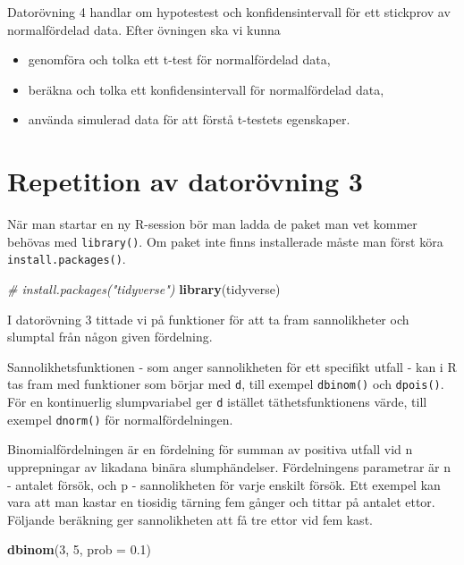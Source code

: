 \documentclass[
]{book}
\newenvironment{Shaded}{\begin{snugshade}}{\end{snugshade}}
\newcommand{\AttributeTok}[1]{\textcolor[rgb]{0.13,0.29,0.53}{#1}}
\newcommand{\CommentTok}[1]{\textcolor[rgb]{0.56,0.35,0.01}{\textit{#1}}}
\newcommand{\DecValTok}[1]{\textcolor[rgb]{0.00,0.00,0.81}{#1}}
\newcommand{\FloatTok}[1]{\textcolor[rgb]{0.00,0.00,0.81}{#1}}
\newcommand{\FunctionTok}[1]{\textcolor[rgb]{0.13,0.29,0.53}{\textbf{#1}}}
\newcommand{\NormalTok}[1]{#1}
\theoremstyle{definition}
\theoremstyle{definition}
\theoremstyle{definition}
\theoremstyle{definition}
\theoremstyle{remark}
\begin{document}
Datorövning 4 handlar om hypotestest och konfidensintervall för ett stickprov av normalfördelad data. Efter övningen ska vi kunna

\begin{itemize}
\item
  genomföra och tolka ett t-test för normalfördelad data,
\item
  beräkna och tolka ett konfidensintervall för normalfördelad data,
\item
  använda simulerad data för att förstå t-testets egenskaper.
\end{itemize}

\hypertarget{repetition-av-datoruxf6vning-3}{%
\section{Repetition av datorövning 3}\label{repetition-av-datoruxf6vning-3}}

När man startar en ny R-session bör man ladda de paket man vet kommer behövas med \texttt{library()}. Om paket inte finns installerade måste man först köra \texttt{install.packages()}.

\begin{Shaded}
\begin{Highlighting}[]
\CommentTok{\# install.packages("tidyverse")}
\FunctionTok{library}\NormalTok{(tidyverse)}
\end{Highlighting}
\end{Shaded}

I datorövning 3 tittade vi på funktioner för att ta fram sannolikheter och slumptal från någon given fördelning.

Sannolikhetsfunktionen - som anger sannolikheten för ett specifikt utfall - kan i R tas fram med funktioner som börjar med \texttt{d}, till exempel \texttt{dbinom()} och \texttt{dpois()}. För en kontinuerlig slumpvariabel ger \texttt{d} istället täthetsfunktionens värde, till exempel \texttt{dnorm()} för normalfördelningen.

Binomialfördelningen är en fördelning för summan av positiva utfall vid n upprepningar av likadana binära slumphändelser. Fördelningens parametrar är n - antalet försök, och p - sannolikheten för varje enskilt försök. Ett exempel kan vara att man kastar en tiosidig tärning fem gånger och tittar på antalet ettor. Följande beräkning ger sannolikheten att få tre ettor vid fem kast.

\begin{Shaded}
\begin{Highlighting}[]
\FunctionTok{dbinom}\NormalTok{(}\DecValTok{3}\NormalTok{, }\DecValTok{5}\NormalTok{, }\AttributeTok{prob =} \FloatTok{0.1}\NormalTok{)}
\end{Highlighting}
\end{Shaded}
\end{document}
